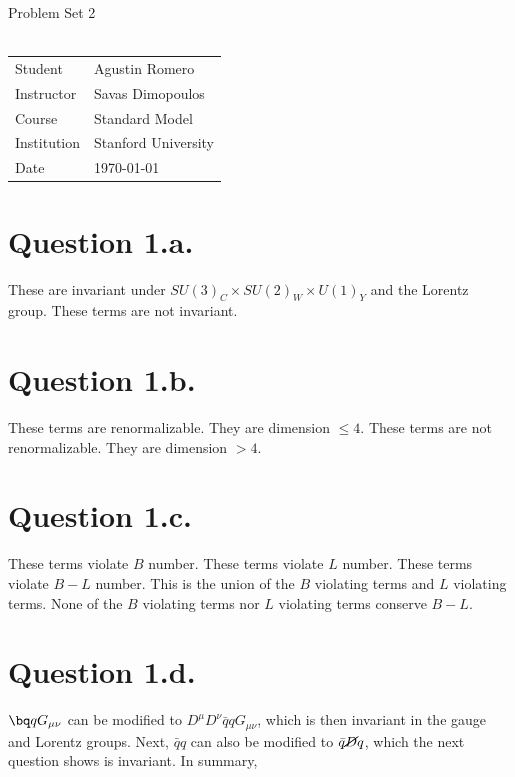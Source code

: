\documentclass{article}
\begin{document}
\begin{center}
{\Large{Problem Set 2}}\\~\\
\begin{tabular}{l l}
Student&Agustin Romero\\
Instructor&Savas Dimopoulos\\
Course&Standard Model\\    
Institution&Stanford University\\
Date&\today\\
\end{tabular}
\end{center}
\section*{Question 1.a.}
These are invariant under $SU(3)_C\times SU(2)_W\times U(1)_Y$ and the Lorentz group.
These terms are not invariant.
\section*{Question 1.b.}
These terms are renormalizable. They are dimension $\leq 4$.
These terms are not renormalizable. They are dimension $> 4$.
\section*{Question 1.c.}
These terms violate $B$ number.
These terms violate $L$ number.
These terms violate $B-L$ number.
This is the union of the $B$ violating terms and $L$ violating terms. None of the $B$ violating terms nor $L$ violating terms conserve $B-L$.
\section*{Question 1.d.}
$\bq q G_{\mu\nu}$ can be modified to $D^\mu D^\nu \bar{q}q G_{\mu\nu}$, which is then invariant in the gauge and Lorentz groups.
Next, $\bar{q}q$ can also be modified to $\bar{q}\cancel{D}q$, which the next question shows is invariant. In summary,
\end{document}
